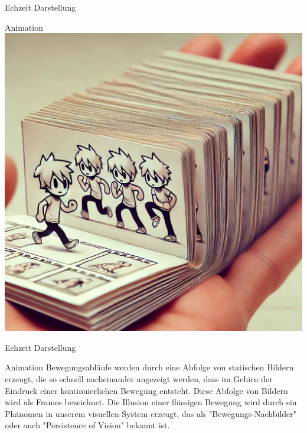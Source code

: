\documentclass{beamer}
\begin{document}
\begin{frame}{Echzeit Darstellung}
    \begin{block}{Animation}
    \includegraphics[scale=0.2]{images/animation.png} 
\end{block}

\end{frame}


  \begin{frame}{Echzeit Darstellung}
    \begin{block}{Animation}
   Bewegungsabläufe werden durch eine Abfolge von statischen Bildern erzeugt, die so schnell nacheinander angezeigt werden, dass im Gehirn der Eindruck einer kontinuierlichen Bewegung entsteht. 
    Diese Abfolge von Bildern wird als Frames bezeichnet. 
    Die Illusion einer flüssigen Bewegung wird durch ein Phänomen in unserem visuellen System erzeugt, das als "Bewegungs-Nachbilder" oder auch "Persistence of Vision" bekannt ist.
\end{block}
\end{frame}
  
\end{document}
